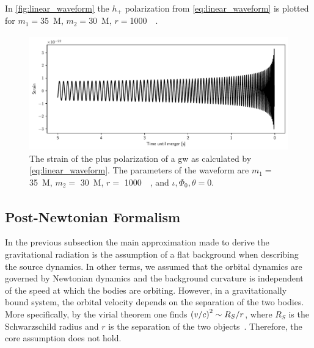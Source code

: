 In \autoref{fig:linear_waveform} the $h_+$ polarization from \eqref{eq:linear_waveform} is plotted for $m_1=$\SI{35}{M_\odot}, $m_2=$\SI{30}{M_\odot}, $r=$\SI{1000}{\mega\parsec}.

\begin{figure}
	\centering
	\includegraphics[width=\textwidth]{chapters/foundations/sections/gw/images/linear_waveform.pdf}
	\caption[Plus polarization waveform linearized gravity]{The strain of the plus polarization of a \acrshort{gw} as calculated by \eqref{eq:linear_waveform}. The parameters of the waveform are $m_1=$ \SI{35}{M_\odot}, $m_2=$ \SI{30}{M_\odot}, $r=$ \SI{1000}{\mega\parsec}, and $\iota, \Phi_0, \theta=0$.}\label{fig:linear_waveform}
\end{figure}


\subsection{Post-Newtonian Formalism}\label{sec:pn}
In the previous subsection the main approximation made to derive the gravitational radiation is the assumption of a flat background when describing the source dynamics. In other terms, we assumed that the orbital dynamics are governed by Newtonian dynamics and the background curvature is independent of the speed at which the bodies are orbiting. However, in a gravitationally bound system, the orbital velocity depends on the separation of the two bodies. More specifically, by the virial theorem one finds ${\left( v/c \right)}^2\sim R_S/r$, where $R_S$ is the Schwarzschild radius and $r$ is the separation of the two objects~\cite{Maggiore:2008aaa}. %
Therefore, the core assumption does not hold.

